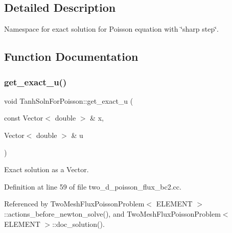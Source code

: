 \subsection{Detailed Description}
Namespace for exact solution for Poisson equation with \char`\"{}sharp step\char`\"{}. 

\subsection{Function Documentation}
\mbox{\label{namespaceTanhSolnForPoisson_af7896e9c18ce6438c73ae2a875e8b7de}} 
\subsubsection{\texorpdfstring{get\+\_\+exact\+\_\+u()}{get\_exact\_u()}}
{\footnotesize\ttfamily void Tanh\+Soln\+For\+Poisson\+::get\+\_\+exact\+\_\+u (\begin{DoxyParamCaption}\item[{const Vector$<$ double $>$ \&}]{x,  }\item[{Vector$<$ double $>$ \&}]{u }\end{DoxyParamCaption})}



Exact solution as a Vector. 



Definition at line 59 of file two\+\_\+d\+\_\+poisson\+\_\+flux\+\_\+bc2.\+cc.



Referenced by Two\+Mesh\+Flux\+Poisson\+Problem$<$ E\+L\+E\+M\+E\+N\+T $>$\+::actions\+\_\+before\+\_\+newton\+\_\+solve(), and Two\+Mesh\+Flux\+Poisson\+Problem$<$ E\+L\+E\+M\+E\+N\+T $>$\+::doc\+\_\+solution().

\mbox{\label{namespaceTanhSolnForPoisson_a0e99ccf27df36f28f091de6d57484172}} 
